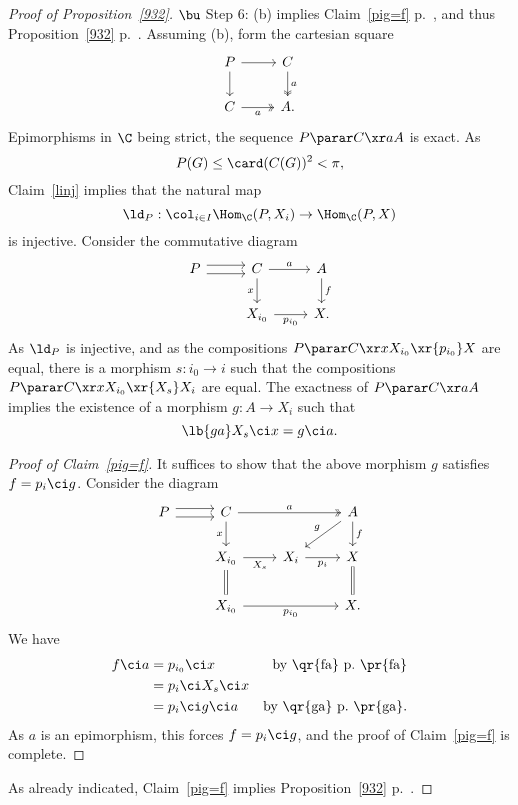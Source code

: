 \documentclass[12pt]{article}
\theoremstyle{remark}
\theoremstyle{definition}
\begin{document}
\begin{proof}[Proof of Proposition~\ref{932}]
\nn$\bu$ Step 6: (b) implies Claim~\ref{pig=f} p.~, and thus Proposition~\ref{932} p.~. Assuming (b), form the cartesian square 
$$
\begin{tikzcd}
P\ar{r}\ar{d}&C\ar[two heads]{d}{a}\\ 
C\ar[two heads]{r}[swap]{a}&A.
\end{tikzcd}
$$
Epimorphisms in $\C$ being strict, the sequence $P\parar C\xr aA$ is exact. As 
$$
P(G)\le\card(C(G))^2<\pi,
$$ 
Claim~\ref{linj} implies that the natural map 
$$
\ld_P:\col_{i\in I}\Hom_\C(P,X_i)\to\Hom_\C(P,X)
$$ 
is injective. Consider the commutative diagram 
$$
\begin{tikzcd}
P\ar[yshift=0.7ex]{r}\ar[yshift=-0.7ex]{r}&C\ar{r}{a}\ar{d}[swap]{x}&A\ar{d}{f}\\ 
{}&X_{i_0}\ar{r}[swap]{p_{i_0}}&X.
\end{tikzcd}
$$ 
As $\ld_P$ is injective, and as the compositions $P\parar C\xr xX_{i_0}\xr{p_{i_0}}X$ are equal, there is a morphism $s:i_0\to i$ such that the compositions $P\parar C\xr xX_{i_0}\xr{X_s} X_i$ are equal. The exactness of $P\parar C\xr aA$ implies the existence of a morphism $g:A\to X_i$ such that 
%
\begin{equation}\lb{ga}
X_s\ci x=g\ci a.
\end{equation} 
% 

\begin{proof}[Proof of Claim~\ref{pig=f}]
It suffices to show that the above morphism $g$ satisfies $f=p_i\ci g$. Consider the diagram 
$$
\begin{tikzcd}
P\ar[yshift=0.7ex]{r}\ar[yshift=-0.7ex]{r}&C\ar{d}[swap]{x}\ar[two heads]{rr}{a}&&A\ar{dl}[swap]{g}\ar{d}{f}\\ 
{}&X_{i_0}\ar{r}[swap]{X_s}\ar[equal]{d}&X_i\ar{r}[swap]{p_i}&X\ar[equal]{d}\\ 
{}&X_{i_0}\ar{rr}[swap]{p_{i_0}}&&X.
\end{tikzcd}
$$ 
We have 
%
\begin{align*}
f\ci a&=p_{i_0}\ci x&\text{by \qr{fa} p.~\pr{fa}}\\ 
&=p_i\ci X_s\ci x\\ 
&=p_i\ci g\ci a&\text{by \qr{ga} p.~\pr{ga}}.
\end{align*}
%
As $a$ is an epimorphism, this forces $f=p_i\ci g$, and the proof of Claim~\ref{pig=f} is complete. 
\end{proof} 

As already indicated, Claim~\ref{pig=f} implies Proposition~\ref{932} p.~. 
\end{proof}  
\end{document}
